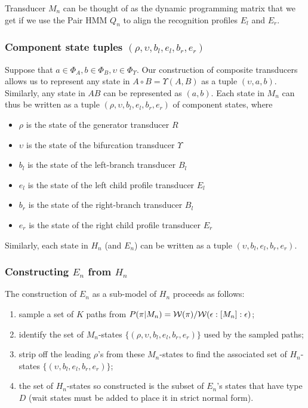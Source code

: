 \documentclass{article}
\newcommand\wtrans[4]{#1(#2 : [#3] : #4)}
\newcommand\compose{}
\newcommand\fork{\circ}
\newcommand\idfork{\Upsilon}
\newcommand\forkn[1]{\idfork(#1)}
\newcommand\forkfun[2]{\forkn{#1, #2}}
\newcommand\States{\Phi}
\newcommand\statesof[1]{\States_{#1}}
\newcommand\weight{{\cal W}}
\newcommand\hstate{(\upsilon,b_l,e_l,b_r,e_r)}
\newcommand\mstate{(\rho,\upsilon,b_l,e_l,b_r,e_r)}
\begin{document}
Transducer $M_n$ can be thought of as the dynamic programming matrix that we get
if we use the Pair HMM $Q_n$ to align the recognition profiles $E_l$ and $E_r$.

\subsubsection{Component state tuples $\mstate$}
Suppose that $a \in \statesof{A}, b \in \statesof{B}, \upsilon \in \statesof{\idfork}$.
Our construction of composite transducers allows us to represent any state in $A \fork B = \forkfun{A}{B}$ as a tuple $(\upsilon, a,b)$.
Similarly, any state in $A \compose B$ can be represented as $(a,b)$.
Each state in $M_n$ can thus be written as a tuple $\mstate$ of component states, where
\begin{itemize}
\item $\rho$ is the state of the generator transducer $R$
\item $\upsilon$ is the state of the bifurcation transducer $\idfork$
\item $b_l$ is the state of the left-branch transducer $B_l$
\item $e_l$ is the state of the left child profile transducer $E_l$
\item $b_r$ is the state of the right-branch transducer $B_l$
\item $e_r$ is the state of the right child profile transducer $E_r$
\end{itemize}
Similarly, each state in $H_n$ (and $E_n$) can be written as a tuple $\hstate$.

\subsubsection{Constructing $E_n$ from $H_n$}
The construction of $E_n$ as a sub-model of $H_n$ proceeds as follows:
\begin{enumerate}
\item sample a set of $K$ paths from $P(\pi | M_n) = \weight(\pi) / \wtrans{\weight}{\epsilon}{M_n}{\epsilon}$;
\item identify the set of $M_n$-states $\{\mstate\}$ used by the sampled paths;
\item strip off the leading $\rho$'s from these $M_n$-states to find the associated set of $H_n$-states $\{\hstate\}$;
\item the set of $H_n$-states so constructed is the subset of $E_n$'s states that have type $D$ (wait states must be added to place it in strict normal form).
\end{enumerate}
\end{document}
